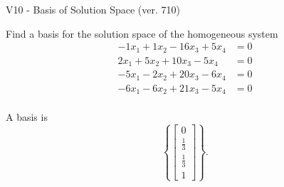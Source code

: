 \begin{exercise}
  \begin{exerciseTitle}V10 - Basis of Solution Space (ver. 710)\end{exerciseTitle}
  \begin{exerciseStatement}
    Find a basis for the solution space of the homogeneous system 
\begin{align*}
 -1 x_ 1 + 1 x_ 2 -16 x_ 3 + 5 x_ 4 &= 0  \\ 
  2 x_ 1 + 5 x_ 2 + 10 x_ 3 -5 x_ 4 &= 0  \\ 
  -5 x_ 1 -2 x_ 2 + 20 x_ 3 -6 x_ 4 &= 0  \\ 
  -6 x_ 1 -6 x_ 2 + 21 x_ 3 -5 x_ 4 &= 0  \\ 
 \end{align*}


 
  \end{exerciseStatement}

  \begin{exerciseAnswer}
   A basis is   
\[\left\{\left[\begin{array}{c}
0 \\
\frac{1}{3} \\
\frac{1}{3} \\
1
\end{array}\right]\right\}.\]

  


  \end{exerciseAnswer}
\end{exercise}